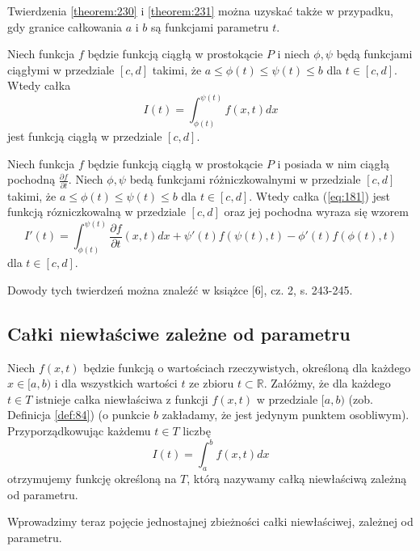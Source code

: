 \documentclass[leqno]{article}
\begin{document}
\begin{justify}
Twierdzenia \ref{theorem:230} i \ref{theorem:231} można uzyskać także w przypadku, gdy granice całkowania $a$ i $b$ są funkcjami parametru $t$. 

\begin{theorem}
{
    Niech funkcja $f$ będzie funkcją ciągłą w prostokącie $P$ i niech $\phi, \psi$ będą funkcjami ciągłymi w przedziale $[c,d]$ takimi, że 
    $a \leqslant \phi(t) \leqslant \psi(t) \leqslant b$ dla $t \in [c,d]$. Wtedy całka 
    \begin{equation}\label{eq:181}
        I(t) = \int_{\phi(t)}^{\psi(t)}f(x,t)dx
    \end{equation}
    jest funkcją ciągłą w przedziale $[c,d]$.
}
\end{theorem}

\begin{theorem}
{
    Niech funkcja $f$ będzie funkcją ciągłą w prostokącie $P$ i posiada w nim ciągłą pochodną $\frac{\partial f}{\partial t}$. Niech
    $\phi, \psi$ bedą funkcjami różniczkowalnymi w przedziale $[c,d]$ takimi, że $a \leqslant \phi(t) \leqslant \psi(t) \leqslant b$ dla $t \in [c,d]$.
    Wtedy całka (\ref{eq:181}) jest funkcją rózniczkowalną w przedziale $[c,d]$ oraz jej pochodna wyraza się wzorem 
    \[
        I'(t) = \int_{\phi(t)}^{\psi(t)}\frac{\partial f}{\partial t}(x,t)dx + \psi'(t)f(\psi(t), t) - \phi'(t)f(\phi(t),t)
    \]
    dla $t \in [c,d]$.
}
\end{theorem}

Dowody tych twierdzeń można znaleźć w książce [6], cz. 2, s. 243-245.

\subsection{Całki niewłaściwe zależne od parametru}

\begin{defn}
    Niech $f(x,t)$ będzie funkcją o wartościach rzeczywistych, określoną dla każdego $x \in [a,b)$ i dla wszystkich wartości $t$ ze zbioru $t \subset \mathbb{R}$.
    Załóżmy, że dla każdego $t \in T$ istnieje całka niewłaściwa z funkcji $f(x,t)$ w przedziale $[a,b)$ (zob. Definicja \ref{def:84}) (o punkcie $b$ zakładamy, że jest
    jedynym punktem osobliwym). Przyporządkowując każdemu $t \in T$ liczbę 
    \[
        I(t) = \int_{a}^{b}f(x,t)dx
    \]
    otrzymujemy funkcję określoną na $T$, którą nazywamy całką niewłaściwą zależną od parametru.
\end{defn}

Wprowadzimy teraz pojęcie jednostajnej zbieżności całki niewłaściwej, zależnej od parametru.


\end{justify}
\end{document}
